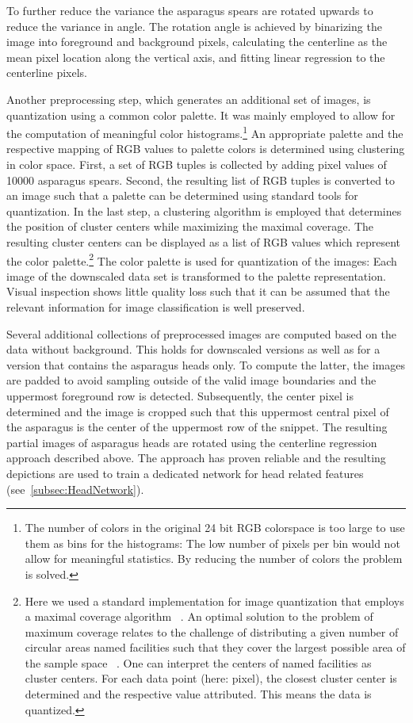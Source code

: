 \bigskip
To further reduce the variance the asparagus spears are rotated upwards to reduce the variance in angle. The rotation angle is achieved by binarizing the image into foreground and background pixels, calculating the centerline as the mean pixel location along the vertical axis, and fitting linear regression to the centerline pixels.

\bigskip
Another preprocessing step, which generates an additional set of images, is quantization using a common color palette. It was mainly employed to allow for the computation of meaningful color histograms.\footnote{The number of colors in the original 24 bit RGB colorspace is too large to use them as bins for the histograms: The low number of pixels per bin would not allow for meaningful statistics. By reducing the number of colors the problem is solved.} An appropriate palette and the respective mapping of RGB values to palette colors is determined using clustering in color space. First, a set of RGB tuples is collected by adding pixel values of 10000 asparagus spears. Second, the resulting list of RGB tuples is converted to an image such that a palette can be determined using standard tools for quantization. In the last step, a clustering algorithm is employed that determines the position of cluster centers while maximizing the maximal coverage. The resulting cluster centers can be displayed as a list of RGB values which represent the color palette.\footnote{Here we used a standard implementation for image quantization that employs a maximal coverage algorithm ~\citep{pil_quantization}. An optimal solution to the problem of maximum coverage relates to the challenge of distributing a given number of circular areas named facilities such that they cover the largest possible area of the sample space ~\citep{zarandi2011large}. One can interpret the centers of named facilities as cluster centers. For each data point (here: pixel), the closest cluster center is determined and the respective value attributed. This means the data is quantized.} The color palette is used for quantization of the images: Each image of the downscaled data set is transformed to the palette representation. Visual inspection shows little quality loss such that it can be assumed that the relevant information for image classification is well preserved.

\bigskip
Several additional collections of preprocessed images are computed based on the data without background. This holds for downscaled versions as well as for a version that contains the asparagus heads only. To compute the latter, the images are padded to avoid sampling outside of the valid image boundaries and the uppermost foreground row is detected. Subsequently, the center pixel is determined and the image is cropped such that this uppermost central pixel of the asparagus is the center of the uppermost row of the snippet. The resulting partial images of asparagus heads are rotated using the centerline regression approach described above. The approach has proven reliable and the resulting depictions are used to train a dedicated network for head related features (see~\autoref{subsec:HeadNetwork}).

